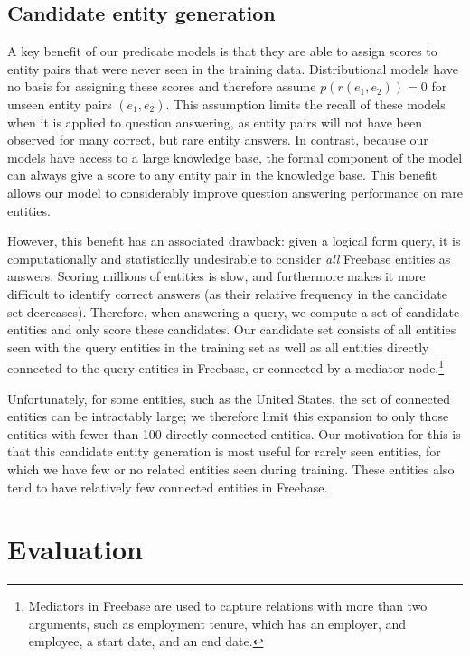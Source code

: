 \documentclass[11pt,letterpaper]{article}
\newcommand{\prob}{\ensuremath{p}}
\begin{document}
\subsection{Candidate entity generation}
\label{sec:better-candidates}

A key benefit of our predicate models is that they are able to assign scores to
entity pairs that were never seen in the training data. Distributional models
have no basis for assigning these scores and therefore assume
$\prob(r(e_1,e_2)) = 0$ for unseen entity pairs $(e_1,e_2)$. This assumption
limits the recall of these models when it is applied to question answering, as
entity pairs will not have been observed for many correct, but rare entity
answers. In contrast, because our models have access to a large knowledge base,
the formal component of the model can always give a score to any entity pair in
the knowledge base.  This benefit allows our model to considerably improve
question answering performance on rare entities.

However, this benefit has an associated drawback: given a logical form query,
it is computationally and statistically undesirable to consider \emph{all}
Freebase entities as answers. Scoring millions of entities is slow, and
furthermore makes it more difficult to identify correct answers (as their
relative frequency in the candidate set decreases).  Therefore, when answering
a query, we compute a set of candidate entities and only score these
candidates. Our candidate set consists of all entities seen with the query
entities in the training set as well as all entities directly connected to the
query entities in Freebase, or connected by a mediator node.\footnote{Mediators
in Freebase are used to capture relations with more than two arguments, such as
employment tenure, which has an employer, and employee, a start date, and an
end date.}

Unfortunately, for some entities, such as the United States, the set of
connected entities can be intractably large; we therefore limit this expansion
to only those entities with fewer than 100 directly connected entities.  Our
motivation for this is that this candidate entity generation is most useful for
rarely seen entities, for which we have few or no related entities seen during
training.  These entities also tend to have relatively few connected entities
in Freebase.

\section{Evaluation}
\label{sec:evaluation}
\end{document}
